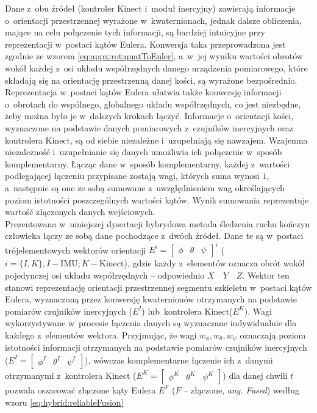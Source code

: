 Dane z~obu źródeł (kontroler Kinect i~moduł inercyjny) zawierają informacje o~orientacji przestrzennej wyrażone w~kwaternionach, jednak dalsze obliczenia, mające na celu połączenie tych informacji, są bardziej intuicyjne przy reprezentacji w~postaci kątów Eulera. Konwersja taka przeprowadzona jest zgodnie ze wzorem \ref{eq:appx:rot:quatToEuler}, a~w~jej wyniku wartości obrotów wokół każdej z~osi układu współrzędnych danego urządzenia pomiarowego, które składają się na orientację przestrzenną danej kości, są wyrażone bezpośrednio. Reprezentacja w~postaci kątów Eulera ułatwia także konwersję informacji o~obrotach do wspólnego, globalnego układu współrzędnych, co jest niezbędne, żeby można było je w~dalszych krokach łączyć. Informacje o~orientacji kości, wyznaczone na podstawie danych pomiarowych z~czujników inercyjnych oraz kontrolera Kinect, są od siebie niezależne i~uzupełniają się nawzajem. Wzajemna niezależność i~uzupełnianie się danych umożliwia ich połączenie w~sposób komplementarny. Łącząc dane w~sposób komplementarny, każdej z~wartości podlegającej łączeniu przypisane zostają wagi, których suma wynosi $1$, a~następnie są one ze sobą sumowane z~uwzględnieniem wag określających poziom istotności poszczególnych wartości kątów. Wynik sumowania reprezentuje wartość złączonych danych wejściowych. \\
										
Prezentowana w~niniejszej dysertacji hybrydowa metoda śledzenia ruchu kończyn człowieka łączy ze sobą dane pochodzące z~dwóch źródeł. Dane te są w~postaci trójelementowych wektorów orientacji $E^i = \begin{bmatrix} \phi &  \theta & \psi \end{bmatrix}^i$ ($i = \{I,K\}, I-\text{IMU}; K-\text{Kinect}$), gdzie każdy z~elementów oznacza obrót wokół pojedynczej osi układu współrzędnych -- odpowiednio $X \quad Y \quad Z$. Wektor ten stanowi reprezentację orientacji przestrzennej segmentu szkieletu w~postaci kątów Eulera, wyznaczoną przez konwersję kwaternionów otrzymanych na podstawie pomiarów czujników inercyjnych ($E^I$) lub~kontrolera Kinect($E^K$). Wagi wykorzystywane w~procesie łączenia danych są wyznaczane indywidualnie dla każdego z~elementów wektora. Przyjmując, że wagi $w_\phi , w_\theta , w_\psi$ oznaczają poziom istotności informacji otrzymanych na podstawie pomiarów czujników inercyjnych ($E^I = \begin{bmatrix}  \phi^I &  \theta^I &  \psi^I \end{bmatrix}$), wówczas komplementarne łączenie ich z~danymi otrzymanymi z~kontrolera Kinect ($E^K = \begin{bmatrix}  \phi^K &  \theta^K &  \psi^K \end{bmatrix}$) dla danej chwili $t$ pozwala oszacować złączone kąty Eulera $E^F$ ($F$ -- złączone, \emph{ang. Fused}) według wzoru \ref{eq:hybrid:reliableFusion}
										
